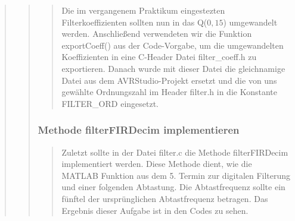 \begin{quote}
\begin{quote}
\begin{quote}
		Die im vergangenem Praktikum eingestezten Filterkoeffizienten sollten nun in
		das Q($0,15$) umgewandelt werden. 
		Anschließend verwendeten wir die Funktion exportCoeff() aus der Code-Vorgabe,
		um die umgewandelten Koeffizienten in eine C-Header Datei filter_coeff.h zu
		exportieren. Danach wurde mit dieser Datei die gleichnamige Datei aus dem
		AVRStudio-Projekt ersetzt und die von uns gewählte Ordnungszahl im Header
		filter.h in die Konstante FILTER_ORD eingesetzt. 
		
		\end{quote}
		
		\subsubsection{Methode filterFIRDecim implementieren}
		\begin{quote}
		
		Zuletzt sollte in der Datei filter.c die Methode filterFIRDecim implementiert
		werden. Diese Methode dient, wie die MATLAB Funktion aus dem 5. Termin zur
		digitalen Filterung und einer folgenden Abtastung. Die Abtastfrequenz sollte
		ein fünftel der ursprünglichen Abtastfrequenz betragen. Das Ergebnis dieser
		Aufgabe ist in den Codes zu sehen.
		
		\end{quote}
	
	\end{quote}%
\end{quote}%

